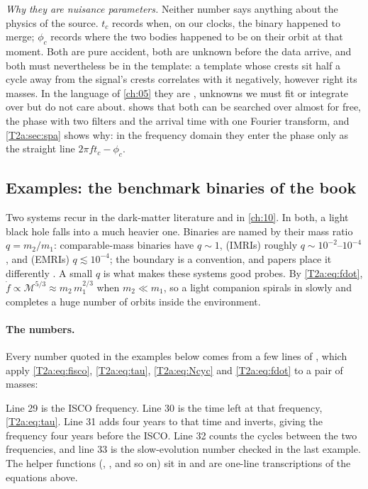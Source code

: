\emph{Why they are nuisance parameters.} Neither number says anything about the physics of the source. $t_c$ records when, on our clocks, the binary happened to merge; $\phi_c$ records where the two bodies happened to be on their orbit at that moment. Both are pure accident, both are unknown before the data arrive, and both must nevertheless be in the template: a template whose crests sit half a cycle away from the signal's crests correlates with it negatively, however right its masses. In the language of \cref{ch:05} they are , unknowns we must fit or integrate over but do not care about.  shows that both can be searched over almost for free, the phase with two filters and the arrival time with one Fourier transform, and \cref{T2a:sec:spa} shows why: in the frequency domain they enter the phase only as the straight line $2\pi ft_c-\phi_c$.

\subsection{Examples: the benchmark binaries of the book}

Two systems recur in the dark-matter literature and in \cref{ch:10}. In both, a light black hole falls into a much heavier one. Binaries are named by their mass ratio $q=m_2/m_1$: comparable-mass binaries have $q\sim1$,  (IMRIs) roughly $q\sim10^{-2}$--$10^{-4}$, and  (EMRIs) $q\lesssim10^{-4}$; the boundary is a convention, and papers place it differently \cite{Speeney2022,Kim2023}. A small $q$ is what makes these systems good probes. By \eqref{T2a:eq:fdot}, $\dot f\propto\mathcal M^{5/3}\approx m_2\,m_1^{2/3}$ when $m_2\ll m_1$, so a light companion spirals in slowly and completes a huge number of orbits inside the environment.

\paragraph{The numbers.}
Every number quoted in the examples below comes from a few lines of , which apply \eqref{T2a:eq:fisco}, \eqref{T2a:eq:tau}, \eqref{T2a:eq:Ncyc} and \eqref{T2a:eq:fdot} to a pair of masses:


\noindent Line 29 is the ISCO frequency. Line 30 is the time left at that frequency, \eqref{T2a:eq:tau}. Line 31 adds four years to that time and inverts, giving the frequency four years before the ISCO. Line 32 counts the cycles between the two frequencies, and line 33 is the slow-evolution number checked in the last example. The helper functions (, , and so on) sit in  and are one-line transcriptions of the equations above.

